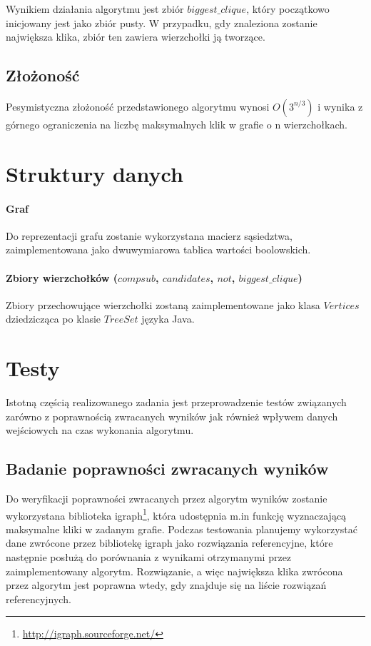 \documentclass[12pt, a4paper]{article}
\begin{document}
Wynikiem działania algorytmu jest zbiór $biggest\_clique$, który początkowo inicjowany jest jako zbiór pusty. W przypadku, gdy znaleziona zostanie największa klika, zbiór ten zawiera wierzchołki ją tworzące.

\subsection{Złożoność}
Pesymistyczna złożoność przedstawionego algorytmu wynosi $O(3^{n/3})$ i wynika z górnego ograniczenia na liczbę maksymalnych klik w grafie o n wierzchołkach.

\section{Struktury danych}
\paragraph{Graf}
Do reprezentacji grafu zostanie wykorzystana macierz sąsiedztwa, zaimplementowana jako dwuwymiarowa tablica wartości boolowskich.

\paragraph{Zbiory wierzchołków ($compsub$, $candidates$, $not$, $biggest\_clique$)}
Zbiory przechowujące wierzchołki zostaną zaimplementowane jako klasa $Vertices$ dziedzicząca po klasie $TreeSet$ języka Java.

\section{Testy}
Istotną częścią realizowanego zadania jest przeprowadzenie testów związanych zarówno z poprawnością zwracanych wyników jak również wpływem danych wejściowych na czas wykonania algorytmu.

\subsection{Badanie poprawności zwracanych wyników}
\label{igraph-testy}
Do weryfikacji poprawności zwracanych przez algorytm wyników zostanie wykorzystana biblioteka igraph\footnote{\url{http://igraph.sourceforge.net/}}, która udostępnia m.in funkcję wyznaczającą maksymalne kliki w zadanym grafie. Podczas testowania planujemy wykorzystać dane zwrócone przez bibliotekę igraph jako rozwiązania referencyjne, które następnie posłużą do porównania z wynikami otrzymanymi przez zaimplementowany algorytm. Rozwiązanie, a więc największa klika zwrócona przez algorytm jest poprawna wtedy, gdy znajduje się na liście rozwiązań referencyjnych.
\end{document}
